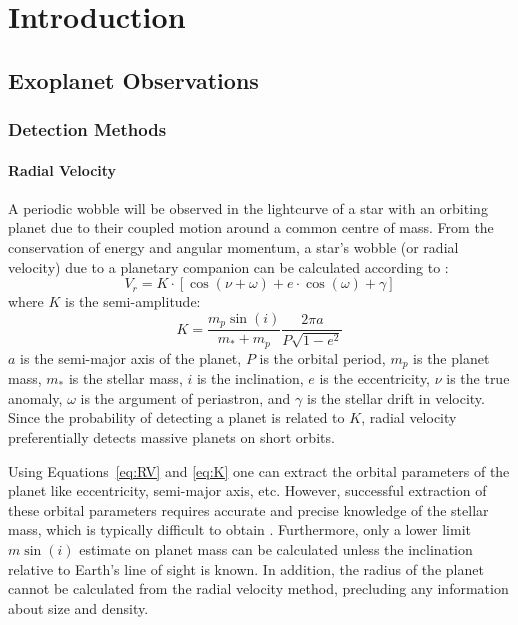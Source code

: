 \chapter{Introduction}
\label{chap:intro}

\section{Exoplanet Observations}
\subsection{Detection Methods}
\subsubsection{Radial Velocity}
\label{sec:RV}
A periodic wobble will be observed in the lightcurve of a star with an orbiting planet due to their coupled motion around a common centre of mass. 
From the conservation of energy and angular momentum, a star's wobble (or radial velocity) due to a planetary companion can be calculated according to \citep{Beauge2007}:
\begin{equation}
V_r = K \cdot [\cos(\nu + \omega) + e\cdot \cos(\omega) + \gamma]
\label{eq:RV}
\end{equation}
where $K$ is the semi-amplitude:
\begin{equation}
K = \frac{m_p \sin(i)}{m_* + m_p} \frac{2\pi a}{P\sqrt{1-e^2}}
\label{eq:K}
\end{equation}
$a$ is the semi-major axis of the planet, $P$ is the orbital period, $m_p$ is the planet mass, $m_*$ is the stellar mass, $i$ is the inclination, $e$ is the eccentricity, $\nu$ is the true anomaly, $\omega$ is the argument of periastron, and $\gamma$ is the stellar drift in velocity.
Since the probability of detecting a planet is related to $K$, radial velocity preferentially detects massive planets on short orbits. 

Using Equations~\ref{eq:RV} and \ref{eq:K} one can extract the orbital parameters of the planet like eccentricity, semi-major axis, etc.
However, successful extraction of these orbital parameters requires accurate and precise knowledge of the stellar mass, which is typically difficult to obtain \citep[e.g.][]{Brown2011}.
Furthermore, only a lower limit $m\sin(i)$ estimate on planet mass can be calculated unless the inclination relative to Earth's line of sight is known. 
In addition, the radius of the planet cannot be calculated from the radial velocity method, precluding any information about size and density.

